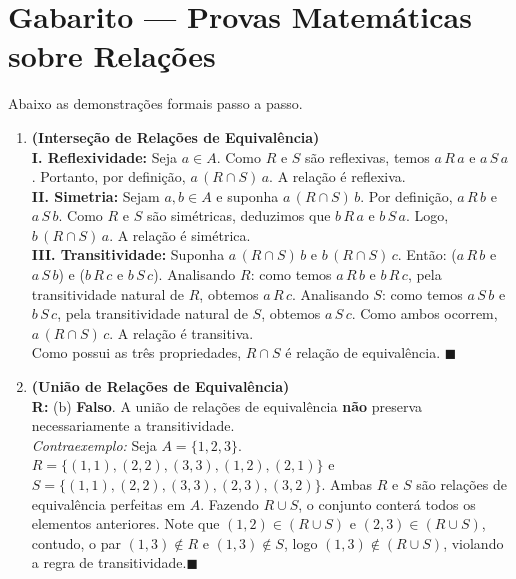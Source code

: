 \documentclass[12pt]{article}
\begin{document}
\vspace*{0.2cm}
\section*{Gabarito — Provas Matemáticas sobre Relações}

Abaixo as demonstrações formais passo a passo.

\begin{enumerate}

\item \textbf{(Interseção de Relações de Equivalência)}\\
\textbf{I. Reflexividade:} Seja $a \in A$. Como $R$ e $S$ são reflexivas, temos $a\,R\,a$ e $a\,S\,a$. Portanto, por definição, $a\,(R \cap S)\,a$. A relação é reflexiva.\\
\textbf{II. Simetria:} Sejam $a,b \in A$ e suponha $a\,(R \cap S)\,b$. Por definição, $a\,R\,b$ e $a\,S\,b$. Como $R$ e $S$ são simétricas, deduzimos que $b\,R\,a$ e $b\,S\,a$. Logo, $b\,(R \cap S)\,a$. A relação é simétrica.\\
\textbf{III. Transitividade:} Suponha $a\,(R \cap S)\,b$ e $b\,(R \cap S)\,c$. Então: ($a\,R\,b$ e $a\,S\,b$) e ($b\,R\,c$ e $b\,S\,c$). Analisando $R$: como temos $a\,R\,b$ e $b\,R\,c$, pela transitividade natural de $R$, obtemos $a\,R\,c$. Analisando $S$: como temos $a\,S\,b$ e $b\,S\,c$, pela transitividade natural de $S$, obtemos $a\,S\,c$. Como ambos ocorrem, $a\,(R \cap S)\,c$. A relação é transitiva. \\
Como possui as três propriedades, $R \cap S$ é relação de equivalência. $\blacksquare$

\vspace{0.3cm}
\item \textbf{(União de Relações de Equivalência)}\\
\textbf{R:} (b) \textbf{Falso}. A união de relações de equivalência \textbf{não} preserva necessariamente a transitividade. \\
\textit{Contraexemplo:} Seja $A=\{1,2,3\}$. $R = \{(1,1),(2,2),(3,3),(1,2),(2,1)\}$ e $S = \{(1,1),(2,2),(3,3),(2,3),(3,2)\}$. Ambas $R$ e $S$ são relações de equivalência perfeitas em $A$. 
Fazendo $R \cup S$, o conjunto conterá todos os elementos anteriores. Note que $(1,2) \in (R \cup S)$ e $(2,3) \in (R \cup S)$, contudo, o par $(1,3) \notin R$ e $(1,3) \notin S$, logo $(1,3) \notin (R \cup S)$, violando a regra de transitividade.$ \blacksquare$


\end{enumerate}
\end{document}
